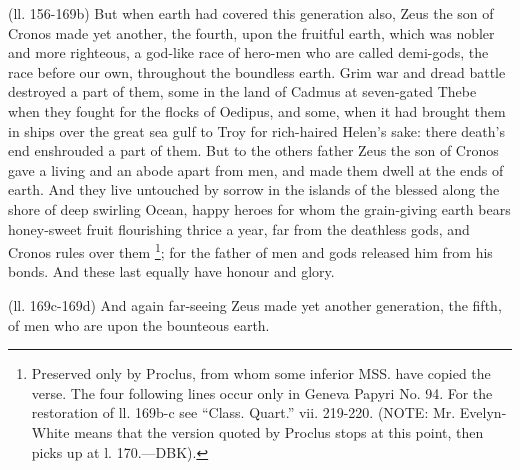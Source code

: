 (ll. 156-169b) But when earth had covered this generation also, Zeus the son of
Cronos made yet another, the fourth, upon the fruitful earth, which was nobler
and more righteous, a god-like race of hero-men who are called demi-gods, the
race before our own, throughout the boundless earth. Grim war and dread battle
destroyed a part of them, some in the land of Cadmus at seven-gated Thebe when
they fought for the flocks of Oedipus, and some, when it had brought them in
ships over the great sea gulf to Troy for rich-haired Helen’s sake: there
death’s end enshrouded a part of them. But to the others father Zeus the
son of Cronos gave a living and an abode apart from men, and made them dwell at
the ends of earth. And they live untouched by sorrow in the islands of the
blessed along the shore of deep swirling Ocean, happy heroes for whom the
grain-giving earth bears honey-sweet fruit flourishing thrice a year, far from
the deathless gods, and Cronos rules over them \footnote{Preserved only by Proclus,
from whom some inferior MSS. have copied the verse. The four following lines
occur only in Geneva Papyri No. 94. For the restoration of ll. 169b-c see
“Class. Quart.” vii. 219-220. (NOTE: Mr. Evelyn-White means that
the version quoted by Proclus stops at this point, then picks up at l.
170.—DBK).}; for the
father of men and gods released him from his bonds. And these last equally have
honour and glory.

(ll. 169c-169d) And again far-seeing Zeus made yet another generation, the
fifth, of men who are upon the bounteous earth.

